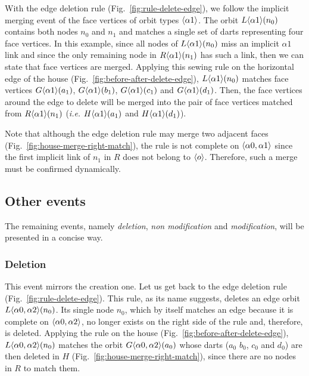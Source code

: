 With the edge deletion rule (Fig.~\ref{fig:rule-delete-edge}), we follow the implicit merging event of the face vertices of orbit types $\langle\alpha 1\rangle$.
The orbit $L\langle\alpha 1\rangle(n_{0})$ contains both nodes $n_{0}$ and $n_{1}$ and matches a single set of darts representing four face vertices.
In this example, since all nodes of $L\langle\alpha 1\rangle(n_{0})$ miss an implicit $\alpha 1$ link and since the only remaining node in $R\langle\alpha 1\rangle(n_{1})$ has such a link, then we can state that face vertices are merged.
Applying this sewing rule on the horizontal edge of the house (Fig.~\ref{fig:before-after-delete-edge}), $L\langle\alpha 1\rangle(n_{0})$ matches face vertices $G\langle\alpha 1\rangle(a_{1})$, $G\langle\alpha 1\rangle(b_{1})$, $G\langle\alpha 1\rangle(c_{1})$ and $G\langle\alpha 1\rangle(d_{1})$.
Then, the face vertices around the edge to delete will be merged into the pair of face vertices matched from $R\langle\alpha 1\rangle(n_{1})$ (\textit{i.e.} $H\langle\alpha 1\rangle(a_{1})$ and $H\langle\alpha 1\rangle(d_{1})$).

Note that although the edge deletion rule may merge two adjacent faces (Fig.~\ref{fig:house-merge-right-match}), the rule is not complete on $\langle\alpha 0, \alpha 1\rangle$ since the first implicit link of $n_1$ in $R$ does not belong to $\langle o\rangle$.
Therefore, such a merge must be confirmed dynamically.


\subsection{Other events}
\label{sec:other-events}

The remaining events, namely \emph{deletion}, \emph{non modification} and
\emph{modification}, will be presented in a concise way.

\subsubsection{Deletion}

This event mirrors the creation one. Let us get back to the edge deletion rule (Fig.~\ref{fig:rule-delete-edge}).
This rule, as its name suggests, deletes an edge orbit $L\langle\alpha 0, \alpha 2\rangle(n_{0})$.
Its single node $n_{0}$, which by itself matches an edge because it is complete on $\langle\alpha 0, \alpha 2\rangle$, no longer exists on the right side of the rule and, therefore, is deleted.
Applying the rule on the house (Fig.~\ref{fig:before-after-delete-edge}), $L\langle\alpha 0, \alpha 2\rangle(n_{0})$ matches the orbit $G\langle\alpha 0, \alpha 2\rangle(a_{0})$ whose darts ($a_0$ $b_0$, $c_0$ and $d_0$) are then deleted in $H$ (Fig.~\ref{fig:house-merge-right-match}), since there are no nodes in $R$ to match them.


